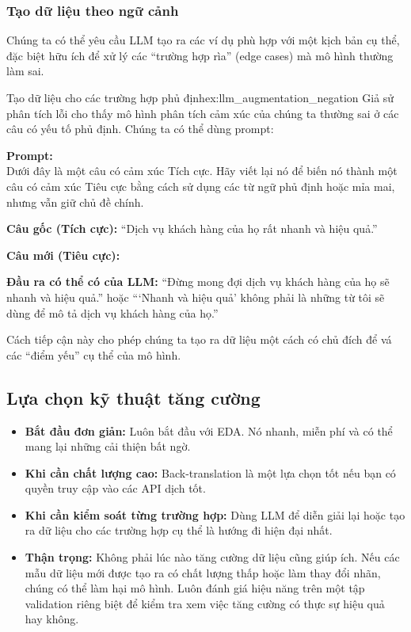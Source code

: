 \subsubsection{Tạo dữ liệu theo ngữ cảnh}
Chúng ta có thể yêu cầu LLM tạo ra các ví dụ phù hợp với một kịch bản cụ thể, đặc biệt hữu ích để xử lý các “trường hợp rìa” (edge cases) mà mô hình thường làm sai.

\begin{example}{Tạo dữ liệu cho các trường hợp phủ định}{ex:llm_augmentation_negation}
    Giả sử phân tích lỗi cho thấy mô hình phân tích cảm xúc của chúng ta thường sai ở các câu có yếu tố phủ định. Chúng ta có thể dùng prompt:
    \begin{promptbox}
    \textbf{Prompt:} \\
    Dưới đây là một câu có cảm xúc Tích cực. Hãy viết lại nó để biến nó thành một câu có cảm xúc Tiêu cực bằng cách sử dụng các từ ngữ phủ định hoặc mỉa mai, nhưng vẫn giữ chủ đề chính.

    \textbf{Câu gốc (Tích cực):} “Dịch vụ khách hàng của họ rất nhanh và hiệu quả.”

    \textbf{Câu mới (Tiêu cực):}
    \end{promptbox}
    \textbf{Đầu ra có thể có của LLM:} “Đừng mong đợi dịch vụ khách hàng của họ sẽ nhanh và hiệu quả.” hoặc “‘Nhanh và hiệu quả’ không phải là những từ tôi sẽ dùng để mô tả dịch vụ khách hàng của họ.”
\end{example}
Cách tiếp cận này cho phép chúng ta tạo ra dữ liệu một cách có chủ đích để vá các “điểm yếu” cụ thể của mô hình.

\subsection{Lựa chọn kỹ thuật tăng cường}
\begin{itemize}
    \item \textbf{Bắt đầu đơn giản:} Luôn bắt đầu với EDA. Nó nhanh, miễn phí và có thể mang lại những cải thiện bất ngờ.
    \item \textbf{Khi cần chất lượng cao:} Back-translation là một lựa chọn tốt nếu bạn có quyền truy cập vào các API dịch tốt.
    \item \textbf{Khi cần kiểm soát từng trường hợp:} Dùng LLM để diễn giải lại hoặc tạo ra dữ liệu cho các trường hợp cụ thể là hướng đi hiện đại nhất.
    \item \textbf{Thận trọng:} Không phải lúc nào tăng cường dữ liệu cũng giúp ích. Nếu các mẫu dữ liệu mới được tạo ra có chất lượng thấp hoặc làm thay đổi nhãn, chúng có thể làm hại mô hình. Luôn đánh giá hiệu năng trên một tập validation riêng biệt để kiểm tra xem việc tăng cường có thực sự hiệu quả hay không.
\end{itemize}